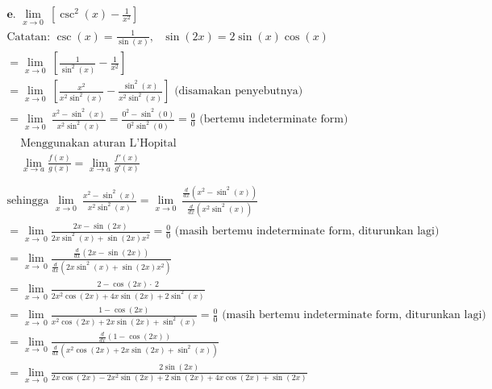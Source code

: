 \documentclass[12pt]{article}
\begin{document}
\begin{fleqn}[1em]
\begin{align*}
\boxed{
\begin{aligned}
  & \textbf{e. } \lim_{x \to 0}\:\left[\csc^2(x) - \frac{1}{x^2}\right] \\
  & \boxed{\text{Catatan: } \csc(x) = \frac{1}{\sin(x)},\:~\:\sin(2x) = 2\sin(x)\cos(x)} \\
  & = \lim_{x \to 0}\:\left[\frac{1}{\sin^2(x)} - \frac{1}{x^2}\right] \\
  & = \lim_{x \to 0}\:\left[\frac{x^2}{x^2\sin^2(x)} - \frac{\sin^2(x)}{x^2\sin^2(x)}\right] \text{ (disamakan penyebutnya)} \\
  & = \lim_{x \to 0}\:\frac{x^2 - \sin^2(x)}{x^2\sin^2(x)}
    = \frac{0^2 - \sin^2(0)}{0^2\sin^2(0)}
    = \frac{0}{0} \text{ (bertemu indeterminate form) } \\
  & \boxed{
    \begin{aligned}
      & \text{Menggunakan aturan L'Hopital} \\
      & \lim_{x \to a} \frac{f(x)}{g(x)} = \lim_{x \to a} \frac{f'(x)}{g'(x)} \\
    \end{aligned}
  } \\
  & \text{sehingga } \lim_{x \to 0}\:\frac{x^2 - \sin^2(x)}{x^2\sin^2(x)}
    = \lim_{x \to 0}\:\frac{\frac{d}{dx}\left(x^2 - \sin^2(x)\right)}{\frac{d}{dx}\left(x^2\sin^2(x)\right)} \\
  & = \lim _{x\to \:0}\frac{2x-\sin \left(2x\right)}{2x\sin ^2\left(x\right)+\sin \left(2x\right)x^2}
    = \frac{0}{0} \text{ (masih bertemu indeterminate form, diturunkan lagi)} \\
  & = \lim _{x\to \:0}\frac{\frac{d}{dx}(2x-\sin \left(2x\right))}{\frac{d}{dx}(2x\sin ^2\left(x\right)+\sin \left(2x\right)x^2)} \\
  & = \lim _{x\to \:0}\frac{2-\cos \left(2x\right)\cdot \:2}{2x^2\cos \left(2x\right)+4x\sin \left(2x\right)+2\sin ^2\left(x\right)} \\
  & = \lim _{x\to \:0} \frac{1-\cos \left(2x\right)}{x^2\cos \left(2x\right)+2x\sin \left(2x\right)+\sin ^2\left(x\right)} = \frac{0}{0} \text{ (masih bertemu indeterminate form, diturunkan lagi)} \\
  & = \lim _{x\to \:0} \frac{\frac{d}{dx}(1-\cos \left(2x\right))}{\frac{d}{dx}(x^2\cos \left(2x\right)+2x\sin \left(2x\right)+\sin ^2\left(x\right))} \\
  & = \lim _{x\to \:0} \frac{2\sin \left(2x\right)}{2x\cos \left(2x\right)-2x^2\sin \left(2x\right)+2\sin \left(2x\right)+4x\cos \left(2x\right)+\sin \left(2x\right)} \\

\end{aligned}}
\end{align*}
\end{fleqn}
\end{document}
